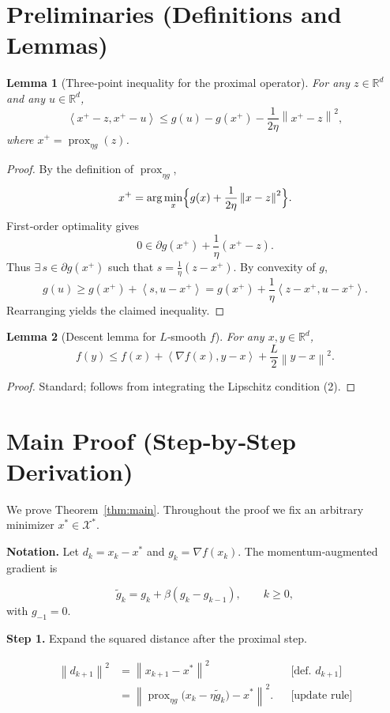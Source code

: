 \documentclass[11pt]{article}
\newtheorem{lemma}{Lemma}
\newcommand{\prox}{\operatorname{prox}}
\newcommand{\norm}[1]{\left\lVert #1\right\rVert}
\newcommand{\inner}[2]{\left\langle #1,#2\right\rangle}
\newcommand{\R}{\mathbb{R}}
\begin{document}
\vspace{0.5cm}
\section*{Preliminaries (Definitions and Lemmas)}
\begin{lemma}[Three‑point inequality for the proximal operator]\label{lem:3pt}
For any $z\in\R^{d}$ and any $u\in\R^{d}$,
\[
\inner{x^{+}-z}{x^{+}-u}\le g(u)-g(x^{+})-\frac{1}{2\eta}\norm{x^{+}-z}^{2},
\]
where $x^{+}= \prox_{\eta g}(z)$. 
\end{lemma}
\begin{proof}
By the definition of $\prox_{\eta g}$,
\[
x^{+}= \arg\min_{x}\Bigl\{g(x)+\frac{1}{2\eta}\norm{x-z}^{2}\Bigr\}.
\]
First‑order optimality gives  
\[
0\in \partial g(x^{+})+\frac{1}{\eta}(x^{+}-z).
\]
Thus $\exists\, s\in\partial g(x^{+})$ such that $s= \frac{1}{\eta}(z-x^{+})$. By convexity of $g$,
\[
g(u)\ge g(x^{+})+\inner{s}{u-x^{+}}=g(x^{+})+\frac{1}{\eta}\inner{z-x^{+}}{u-x^{+}}.
\]
Rearranging yields the claimed inequality. \qedhere
\end{proof}

\begin{lemma}[Descent lemma for $L$‑smooth $f$]\label{lem:descent}
For any $x,y\in\R^{d}$,
\[
f(y)\le f(x)+\inner{\nabla f(x)}{y-x}+\frac{L}{2}\norm{y-x}^{2}.
\]
\end{lemma}
\begin{proof}
Standard; follows from integrating the Lipschitz condition (2). \qedhere
\end{proof}

\vspace{0.2cm}
\section*{Main Proof (Step‑by‑Step Derivation)}
We prove Theorem~\ref{thm:main}. Throughout the proof we fix an arbitrary minimizer $x^{*}\in\mathcal{X}^{*}$.

\noindent\textbf{Notation.} Let $d_{k}=x_{k}-x^{*}$ and $g_{k}= \nabla f(x_{k})$. The momentum‑augmented gradient is  

\[
\tilde g_{k}=g_{k}+ \beta (g_{k}-g_{k-1}),\qquad k\ge0,
\]
with $g_{-1}=0$.

\noindent\textbf{Step 1.} Expand the squared distance after the proximal step.  

\[
\begin{aligned}
\norm{d_{k+1}}^{2}
&=\norm{x_{k+1}-x^{*}}^{2}                                        &&\text{[def. $d_{k+1}$]}\\
&=\norm{\prox_{\eta g}\!\bigl(x_{k}-\eta\tilde g_{k}\bigr)-x^{*}}^{2}. &&\text{[update rule]}
\end{aligned}
\tag{6}
\]
\end{document}
